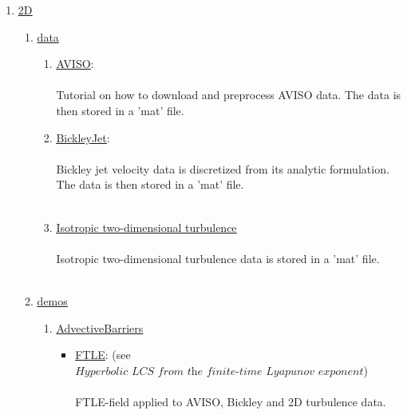 \documentclass{article}
\begin{document}
\begin{enumerate}
\item  \href{https://github.com/EncinasBartos/TBarrier/tree/main/TBarrier/2D}{\underline{2D}}
\begin{enumerate}
\item \href{https://github.com/EncinasBartos/TBarrier/tree/main/TBarrier/2D/data}{\underline{data}}
\begin{enumerate}
\item \href{https://github.com/EncinasBartos/TBarrier/tree/main/TBarrier/2D/data/AVISO}{\underline{AVISO}}: \\ \\
Tutorial on how to download and preprocess AVISO data. The data is then stored in a 'mat' file. \\
\item \href{https://github.com/EncinasBartos/TBarrier/tree/main/TBarrier/2D/data/BickleyJet}{\underline{BickleyJet}}: \\ \\
Bickley jet velocity data is discretized from its analytic formulation. The data is then stored in a 'mat' file. \\ \\
\item \href{https://github.com/EncinasBartos/TBarrier/tree/main/TBarrier/2D/data/Turbulence}{\underline{Isotropic two-dimensional turbulence}} \\ \\
Isotropic two-dimensional turbulence data is stored in a 'mat' file. \\ \\
\end{enumerate}
\item \href{https://github.com/EncinasBartos/TBarrier/tree/main/TBarrier/2D/demos}{\underline{demos}} \\
\begin{enumerate}
\item \href{https://github.com/EncinasBartos/TBarrier/tree/main/TBarrier/2D/demos/AdvectiveBarriers}{\underline{AdvectiveBarriers}} \\
\begin{itemize}
\item \href{https://github.com/EncinasBartos/TBarrier/tree/main/TBarrier/2D/demos/AdvectiveBarriers/FTLE}{\underline{FTLE}}: (see $ \textit{Hyperbolic LCS from the finite-time Lyapunov exponent} $) \\ \\
FTLE-field applied to AVISO, Bickley and 2D turbulence data. \\ \\

\end{itemize}
\end{enumerate}
\end{enumerate}
\end{enumerate}
\end{document}
